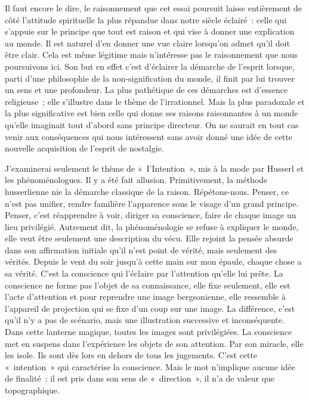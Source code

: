 \documentclass{book}
\begin{document}
Il faut encore le dire, le raisonnement que cet essai poursuit laisse entièrement de côté l'attitude spirituelle la plus répandue dans notre siècle éclairé : celle qui s'appuie sur le principe que tout est raison et qui vise à donner une explication au monde. Il est naturel d'en donner une vue claire lorsqu'on admet qu'il doit être clair. Cela est même légitime mais n'intéresse pas le raisonnement que nous poursuivons ici. Son but en effet c'est d'éclairer la démarche de l'esprit lorsque, parti d'une philosophie de la non-signification du monde, il finit par lui trouver un sens et une profondeur. La plus pathétique de ces démarches est d'essence religieuse ; elle s'illustre dans le thème de l'irrationnel. Mais la plus paradoxale et la plus significative est bien celle qui donne ses raisons raisonnantes à un monde qu'elle imaginait tout d'abord sans principe directeur. On ne saurait en tout cas venir aux conséquences qui nous intéressent sans avoir donné une idée de cette nouvelle acquisition de l'esprit de nostalgie.

J'examinerai seulement le thème de « I'Intention », mis à la mode par Husserl et les phénoménologues. Il y a été fait allusion. Primitivement, la méthode husserlienne nie la démarche classique de la raison. Répétons-nous. Penser, ce n'est pas unifier, rendre familière l'apparence sous le visage d'un grand principe. Penser, c'est réapprendre à voir, diriger sa conscience, faire de chaque image un lieu privilégié. Autrement dit, la phénoménologie se refuse à expliquer le monde, elle veut être seulement une description du vécu. Elle rejoint la pensée absurde dans son affirmation initiale qu'il n'est point de vérité, mais seulement des vérités. Depuis le vent du soir jusqu'à cette main sur mon épaule, chaque chose a sa vérité. C'est la conscience qui l'éclaire par l'attention qu'elle lui prête. La conscience ne forme pas l'objet de sa connaissance, elle fixe seulement, elle est l'acte d'attention et pour reprendre une image bergsonienne, elle ressemble à l'appareil de projection qui se fixe d'un coup sur une image. La différence, c'est qu'il n'y a pas de scénario, mais une illustration successive et inconséquente. Dans cette lanterne magique, toutes les images sont privilégiées. La conscience met en suspens dans l'expérience les objets de son attention. Par son miracle, elle les isole. Ils sont dès lors en dehors de tous les jugements. C'est cette « intention » qui caractérise la conscience. Mais le mot n'implique aucune idée de finalité ; il est pris dans son sens de « direction », il n'a de valeur que topographique.
\end{document}
